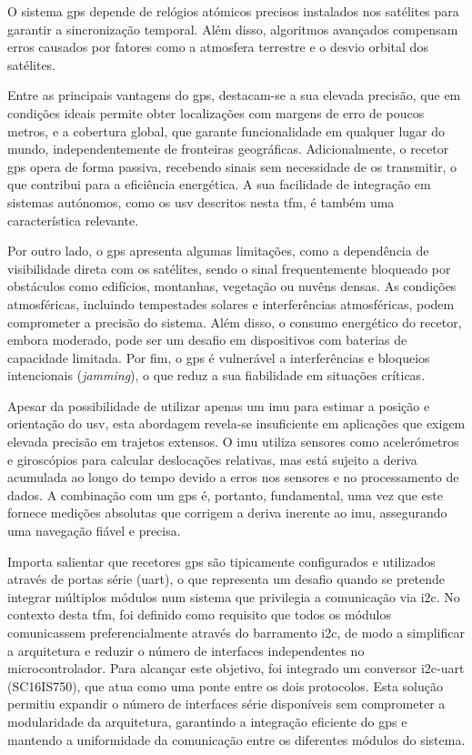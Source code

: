 O sistema \gls{gps} depende de relógios atómicos precisos instalados nos satélites para garantir a sincronização temporal. Além disso, algoritmos avançados compensam erros causados por fatores como a atmosfera terrestre e o desvio orbital dos satélites.

Entre as principais vantagens do \gls{gps}, destacam-se a sua elevada precisão, que em condições ideais permite obter localizações com margens de erro de poucos metros, e a cobertura global, que garante funcionalidade em qualquer lugar do mundo, independentemente de fronteiras geográficas. Adicionalmente, o recetor \gls{gps} opera de forma passiva, recebendo sinais sem necessidade de os transmitir, o que contribui para a eficiência energética. A sua facilidade de integração em sistemas autónomos, como os \gls{usv} descritos nesta \gls{tfm}, é também uma característica relevante.

Por outro lado, o \gls{gps} apresenta algumas limitações, como a dependência de visibilidade direta com os satélites, sendo o sinal frequentemente bloqueado por obstáculos como edifícios, montanhas, vegetação ou nuvêns densas. As condições atmosféricas, incluindo tempestades solares e interferências atmosféricas, podem comprometer a precisão do sistema. Além disso, o consumo energético do recetor, embora moderado, pode ser um desafio em dispositivos com baterias de capacidade limitada. Por fim, o \gls{gps} é vulnerável a interferências e bloqueios intencionais (\emph{jamming}), o que reduz a sua fiabilidade em situações críticas.

Apesar da possibilidade de utilizar apenas um \gls{imu} para estimar a posição e orientação do \gls{usv}, esta abordagem revela-se insuficiente em aplicações que exigem elevada precisão em trajetos extensos. O \gls{imu} utiliza sensores como acelerómetros e giroscópios para calcular deslocações relativas, mas está sujeito a deriva acumulada ao longo do tempo devido a erros nos sensores e no processamento de dados. A combinação com um \gls{gps} é, portanto, fundamental, uma vez que este fornece medições absolutas que corrigem a deriva inerente ao \gls{imu}, assegurando uma navegação fiável e precisa.  

Importa salientar que recetores \gls{gps} são tipicamente configurados e utilizados através de portas série (\gls{uart}), o que representa um desafio quando se pretende integrar múltiplos módulos num sistema que privilegia a comunicação via \gls{i2c}. No contexto desta \gls{tfm}, foi definido como requisito que todos os módulos comunicassem preferencialmente através do barramento \gls{i2c}, de modo a simplificar a arquitetura e reduzir o número de interfaces independentes no microcontrolador. Para alcançar este objetivo, foi integrado um conversor \gls{i2c}-\gls{uart} (SC16IS750), que atua como uma ponte entre os dois protocolos. Esta solução permitiu expandir o número de interfaces série disponíveis sem comprometer a modularidade da arquitetura, garantindo a integração eficiente do \gls{gps} e mantendo a uniformidade da comunicação entre os diferentes módulos do sistema.  


